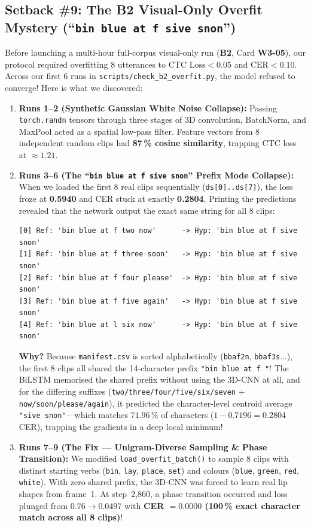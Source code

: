 \documentclass[11pt,a4paper]{article}
\newcommand{\code}[1]{\texttt{\small #1}}
\begin{document}
\subsection{Setback \#9: The B2 Visual-Only Overfit Mystery (``\code{bin blue at f sive snon}'')}
Before launching a multi-hour full-corpus visual-only run (\textbf{B2}, Card \textbf{W3-05}), our protocol required overfitting 8 utterances to $\text{CTC Loss} < 0.05$ and $\text{CER} < 0.10$. Across our first 6 runs in \code{scripts/check\_b2\_overfit.py}, the model refused to converge! Here is what we discovered:
\begin{enumerate}
  \item \textbf{Runs 1--2 (Synthetic Gaussian White Noise Collapse):} Passing \code{torch.randn} tensors through three stages of 3D convolution, BatchNorm, and MaxPool acted as a spatial low-pass filter. Feature vectors from 8 independent random clips had \textbf{87\,\% cosine similarity}, trapping CTC loss at $\approx 1.21$.
  \item \textbf{Runs 3--6 (The ``\code{bin blue at f sive snon}'' Prefix Mode Collapse):} When we loaded the first 8 real clips sequentially (\code{ds[0]..ds[7]}), the loss froze at \textbf{0.5940} and CER stuck at exactly \textbf{0.2804}. Printing the predictions revealed that the network output the exact same string for all 8 clips:
\begin{lstlisting}
[0] Ref: 'bin blue at f two now'      -> Hyp: 'bin blue at f sive snon'
[1] Ref: 'bin blue at f three soon'   -> Hyp: 'bin blue at f sive snon'
[2] Ref: 'bin blue at f four please'  -> Hyp: 'bin blue at f sive snon'
[3] Ref: 'bin blue at f five again'   -> Hyp: 'bin blue at f sive snon'
[4] Ref: 'bin blue at l six now'      -> Hyp: 'bin blue at f sive snon'
\end{lstlisting}
  \textbf{Why?} Because \code{manifest.csv} is sorted alphabetically (\code{bbaf2n}, \code{bbaf3s}...), the first 8 clips all shared the 14-character prefix \code{"bin blue at f "}! The BiLSTM memorised the shared prefix without using the 3D-CNN at all, and for the differing suffixes (\code{two/three/four/five/six/seven} + \code{now/soon/please/again}), it predicted the character-level centroid average \code{"sive snon"}---which matches $71.96\,\%$ of characters ($1 - 0.7196 = 0.2804$ CER), trapping the gradients in a deep local minimum!
  \item \textbf{Runs 7--9 (The Fix --- Unigram-Diverse Sampling \& Phase Transition):} We modified \code{load\_overfit\_batch()} to sample 8 clips with distinct starting verbs (\code{bin}, \code{lay}, \code{place}, \code{set}) and colours (\code{blue}, \code{green}, \code{red}, \code{white}). With zero shared prefix, the 3D-CNN was forced to learn real lip shapes from frame~1. At step~2,860, a phase transition occurred and loss plunged from $0.76 \to \mathbf{0.0497}$ with \textbf{CER $= 0.0000$ (100\,\% exact character match across all 8 clips)}!
\end{enumerate}
\end{document}
